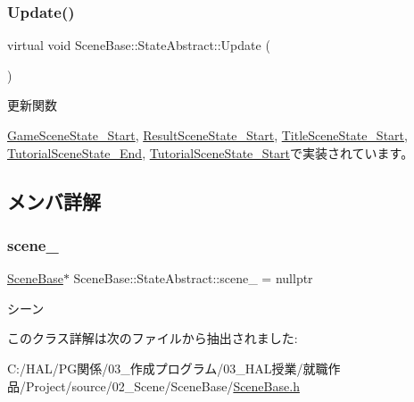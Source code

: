 \subsubsection{\texorpdfstring{Update()}{Update()}}
{\footnotesize\ttfamily virtual void Scene\+Base\+::\+State\+Abstract\+::\+Update (\begin{DoxyParamCaption}{ }\end{DoxyParamCaption})\hspace{0.3cm}{\ttfamily [pure virtual]}}



更新関数 



\mbox{\hyperlink{class_game_scene_state___start_ae11bb8d8ea9eae4fea2a9acf33dd1c8b}{Game\+Scene\+State\+\_\+\+Start}}, \mbox{\hyperlink{class_result_scene_state___start_a2ecdef2bef0cd1a04055e8687e11199b}{Result\+Scene\+State\+\_\+\+Start}}, \mbox{\hyperlink{class_title_scene_state___start_a2e98cf6810711b58766d7147168d02eb}{Title\+Scene\+State\+\_\+\+Start}}, \mbox{\hyperlink{class_tutorial_scene_state___end_a7cdf03fa9a0e41ab86c2b41b8165ad09}{Tutorial\+Scene\+State\+\_\+\+End}}, \mbox{\hyperlink{class_tutorial_scene_state___start_a93c322692bf56172f383d3e5b17cd85c}{Tutorial\+Scene\+State\+\_\+\+Start}}で実装されています。



\subsection{メンバ詳解}
\mbox{\label{class_scene_base_1_1_state_abstract_a322b66f53e08f55bc91aa2a2b4eded02}} 
\subsubsection{\texorpdfstring{scene\+\_\+}{scene\_}}
{\footnotesize\ttfamily \mbox{\hyperlink{class_scene_base}{Scene\+Base}}$\ast$ Scene\+Base\+::\+State\+Abstract\+::scene\+\_\+ = nullptr\hspace{0.3cm}{\ttfamily [protected]}}



シーン 



このクラス詳解は次のファイルから抽出されました\+:\begin{DoxyCompactItemize}
\item 
C\+:/\+H\+A\+L/\+P\+G関係/03\+\_\+作成プログラム/03\+\_\+\+H\+A\+L授業/就職作品/\+Project/source/02\+\_\+\+Scene/\+Scene\+Base/\mbox{\hyperlink{_scene_base_8h}{Scene\+Base.\+h}}\end{DoxyCompactItemize}
